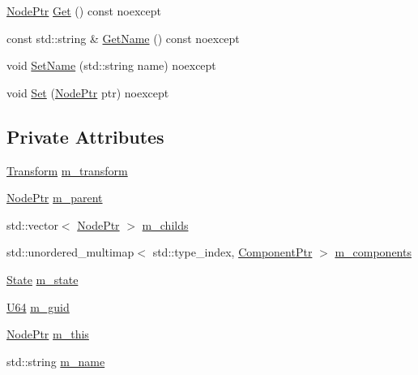 \begin{DoxyCompactItemize}
\item 
\mbox{\hyperlink{classmage_1_1_node_ac575dc006e0ae1134277ade977dc06b6}{Node\+Ptr}} \mbox{\hyperlink{classmage_1_1_node_ac317011c240a845fbdb7209e26d560f2}{Get}} () const noexcept
\item 
const std\+::string \& \mbox{\hyperlink{classmage_1_1_node_a66c1c1c76861ecb7d26252a9da865f63}{Get\+Name}} () const noexcept
\item 
void \mbox{\hyperlink{classmage_1_1_node_a7fabe953ff8ca39e7e499fc16d551965}{Set\+Name}} (std\+::string name) noexcept
\item 
void \mbox{\hyperlink{classmage_1_1_node_aabbe500cdf7842b663bfcf034de25c5a}{Set}} (\mbox{\hyperlink{classmage_1_1_node_ac575dc006e0ae1134277ade977dc06b6}{Node\+Ptr}} ptr) noexcept
\end{DoxyCompactItemize}
\subsection*{Private Attributes}
\begin{DoxyCompactItemize}
\item 
\mbox{\hyperlink{classmage_1_1_transform}{Transform}} \mbox{\hyperlink{classmage_1_1_node_a0f4dd0c46d9713fd64b0e562862afac6}{m\+\_\+transform}}
\item 
\mbox{\hyperlink{classmage_1_1_node_ac575dc006e0ae1134277ade977dc06b6}{Node\+Ptr}} \mbox{\hyperlink{classmage_1_1_node_aa04f166b52fca444c8756c0864a16cde}{m\+\_\+parent}}
\item 
std\+::vector$<$ \mbox{\hyperlink{classmage_1_1_node_ac575dc006e0ae1134277ade977dc06b6}{Node\+Ptr}} $>$ \mbox{\hyperlink{classmage_1_1_node_a1d1d432f46c61932b5167d27d20cc383}{m\+\_\+childs}}
\item 
std\+::unordered\+\_\+multimap$<$ std\+::type\+\_\+index, \mbox{\hyperlink{classmage_1_1_node_a46b7e1f4f5b98bfa78ed96a80797a4ba}{Component\+Ptr}} $>$ \mbox{\hyperlink{classmage_1_1_node_a804d53398f193b6b06f883131ab7415d}{m\+\_\+components}}
\item 
\mbox{\hyperlink{namespacemage_ae47d13d8477ee94893b9a3947d28eebc}{State}} \mbox{\hyperlink{classmage_1_1_node_a76b775e32bb001c54a9927461eaf7926}{m\+\_\+state}}
\item 
\mbox{\hyperlink{namespacemage_ae0ad2dd0035dba92ed0f2e84c182b03b}{U64}} \mbox{\hyperlink{classmage_1_1_node_a3ef1876293074bfcc01104eb92f1bfdf}{m\+\_\+guid}}
\item 
\mbox{\hyperlink{classmage_1_1_node_ac575dc006e0ae1134277ade977dc06b6}{Node\+Ptr}} \mbox{\hyperlink{classmage_1_1_node_ab056e1563dca22433efa152f4b6da46f}{m\+\_\+this}}
\item 
std\+::string \mbox{\hyperlink{classmage_1_1_node_a69cfc52bdc0572dfc776e2ff27c9eec2}{m\+\_\+name}}
\end{DoxyCompactItemize}


